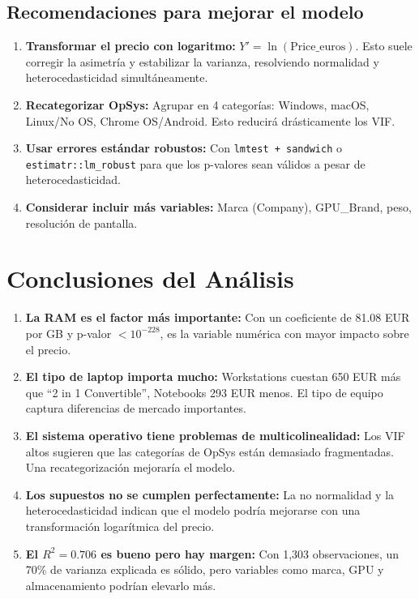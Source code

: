 \documentclass[12pt,a4paper]{article}
\begin{document}
\subsection{Recomendaciones para mejorar el modelo}

\begin{enumerate}
    \item \textbf{Transformar el precio con logaritmo:} $Y' = \ln(\text{Price\_euros})$. Esto suele corregir la asimetría y estabilizar la varianza, resolviendo normalidad y heterocedasticidad simultáneamente.
    
    \item \textbf{Recategorizar OpSys:} Agrupar en 4 categorías: Windows, macOS, Linux/No OS, Chrome OS/Android. Esto reducirá drásticamente los VIF.
    
    \item \textbf{Usar errores estándar robustos:} Con \texttt{lmtest + sandwich} o \texttt{estimatr::lm\_robust} para que los p-valores sean válidos a pesar de heterocedasticidad.
    
    \item \textbf{Considerar incluir más variables:} Marca (Company), GPU\_Brand, peso, resolución de pantalla.
\end{enumerate}

\section{Conclusiones del Análisis}

\begin{enumerate}
    \item \textbf{La RAM es el factor más importante:} Con un coeficiente de 81.08 EUR por GB y p-valor $< 10^{-228}$, es la variable numérica con mayor impacto sobre el precio.
    
    \item \textbf{El tipo de laptop importa mucho:} Workstations cuestan 650 EUR más que ``2 in 1 Convertible'', Notebooks 293 EUR menos. El tipo de equipo captura diferencias de mercado importantes.
    
    \item \textbf{El sistema operativo tiene problemas de multicolinealidad:} Los VIF altos sugieren que las categorías de OpSys están demasiado fragmentadas. Una recategorización mejoraría el modelo.
    
    \item \textbf{Los supuestos no se cumplen perfectamente:} La no normalidad y la heterocedasticidad indican que el modelo podría mejorarse con una transformación logarítmica del precio.
    
    \item \textbf{El $R^2 = 0.706$ es bueno pero hay margen:} Con 1,303 observaciones, un 70\% de varianza explicada es sólido, pero variables como marca, GPU y almacenamiento podrían elevarlo más.
\end{enumerate}
\end{document}
